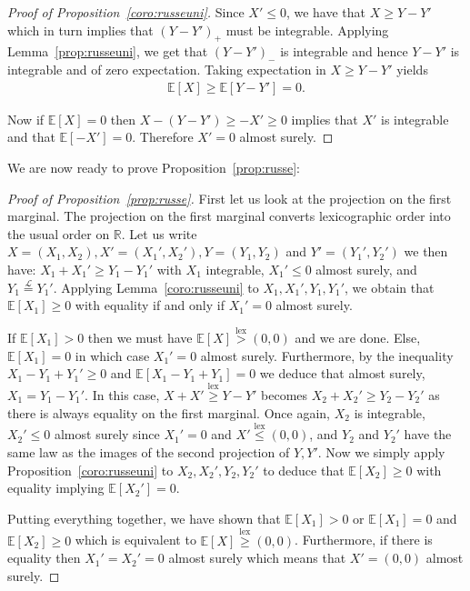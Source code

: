\documentclass[11pt]{article}
\DeclareMathOperator{\lex}{lex}
\begin{document}
\begin{proof}[Proof of Proposition~\ref{coro:russeuni}]
    Since $X'\leq 0$, we have that $X\geq Y-Y'$ which in turn implies that $(Y-Y')_+$ must be integrable. 
    Applying Lemma~\ref{prop:russeuni}, we get that $(Y-Y')_-$ is integrable and hence $Y-Y'$ is integrable and of zero expectation.
    Taking expectation in $X \geq Y-Y'$ yields 
    \begin{align*}
        \mathbb{E}[X] \geq \mathbb{E}[Y-Y']=0.
    \end{align*}

    Now if $\mathbb{E}[X]=0$ then $X-(Y-Y') \geq -X' \geq 0$ implies that $X'$ is integrable and that $\mathbb{E}[-X']=0$. Therefore $X'=0$ almost surely.
\end{proof}
We are now ready to prove Proposition~\ref{prop:russe}:
\begin{proof}[Proof of Proposition~\ref{prop:russe}]
First let us look at the projection on the first marginal. The projection on the first marginal converts lexicographic order into the usual order on $\mathbb{R}$.
Let us write $X=(X_1,X_2), X'=(X_1',X_2'), Y=(Y_1,Y_2)$ and $Y'=(Y_1',Y_2')$ we then have:
$X_1+X_1' \geq Y_1-Y_1'$ with $X_1$ integrable, $X_1' \leq 0$ almost surely, and $Y_1 \overset{\mathcal{L}}{=} Y_1'$.
Applying Lemma~\ref{coro:russeuni} to $X_1,X_1',Y_1,Y_1'$, we obtain that $\mathbb{E}[X_1]\geq 0$ with equality if and only if $X_1'=0$ almost surely.

If $\mathbb{E}[X_1]>0$ then we must have $\mathbb{E}[X] \overset{\lex}{>}(0,0)$ and we are done. Else, $\mathbb{E}[X_1]=0$ in which case $X_1'=0$ almost surely.
Furthermore, by the inequality $X_1-Y_1+Y_1' \geq 0$ and $\mathbb{E}[X_1-Y_1+Y_1]=0$ we deduce that almost surely, $X_1=Y_1-Y_1'$.
In this case, $X+X' \overset{\lex}{\geq} Y-Y'$ becomes $X_2+X_2'\geq Y_2-Y_2'$ as there is always equality on the first marginal.
Once again, $X_2$ is integrable, $X_2'\leq 0$ almost surely since $X_1'=0$ and $X' \overset{\lex}{\leq }(0,0)$, and $Y_2$ and $Y_2'$ have the same law as the images of the second projection of $Y,Y'$.
Now we simply apply Proposition~\ref{coro:russeuni} to $X_2,X_2',Y_2,Y_2'$ to deduce that $\mathbb{E}[X_2]\geq 0$ with equality implying $\mathbb{E}[X_2']=0$.

Putting everything together, we have shown that $\mathbb{E}[X_1]>0$ or $\mathbb{E}[X_1]=0$ and $\mathbb{E}[X_2]\geq 0$ which is equivalent to $\mathbb{E}[X] \overset{\lex}{\geq }(0,0)$. Furthermore, if there is equality then $X_1'=X_2'=0$ almost surely which means that $X'=(0,0)$ almost surely.
\end{proof}
\end{document}

